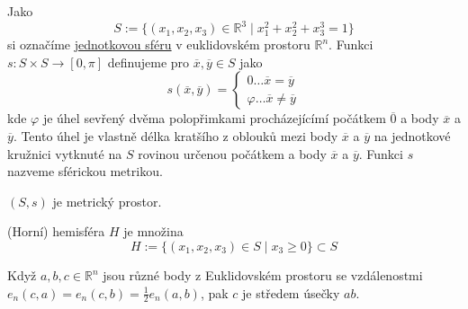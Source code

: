 \documentclass[../main.tex]{subfiles}
\begin{document}
\begin{example}
    Jako \[S := \{ (x_1,x_2,x_3) \in \mathbb{R}^3 \mid x_1^2 + x_2^2 + x_3^3 = 1 \}\] si označíme \underline{jednotkovou sféru} v
    euklidovském prostoru $\mathbb{R}^n$. Funkci $s: S\times S \to [0,\pi]$ definujeme pro $\overline{x}, \overline{y} \in S$
    jako \[ s(\overline{x}, \overline{y}) = \begin{cases}
        0 \dots \overline{x} = \overline{y}\\
        \varphi \dots \overline{x} \neq \overline{y}
    \end{cases} \]
    kde $\varphi$ je úhel sevřený dvěma polopřimkami procházejícímí počátkem $\overline{0}$ a body $\overline{x}$ a $\overline{y}$.
    Tento úhel je vlastně délka kratšího z oblouků mezi body $\overline{x}$ a $\overline{y}$ na jednotkové kružnici vytknuté na $S$ rovinou určenou
    počátkem a body $\overline{x}$ a $\overline{y}$. Funkci $s$ nazveme sférickou metrikou.
\end{example}

\begin{lemma}
    $(S,s)$ je metrický prostor.
\end{lemma}

\begin{definition}
    (Horní) hemisféra $H$ je množina \[ H := \{ (x_1,x_2,x_3) \in S \mid x_3 \geq 0 \} \subset S \]
\end{definition}

\begin{lemma}
    Když $a,b,c \in\mathbb{R}^n$ jsou různé body z Euklidovském prostoru se vzdálenostmi $e_n(c,a) = e_n(c,b) = \frac{1}{2}e_n(a,b)$,
    pak $c$ je středem úsečky $ab$.
\end{lemma}
\end{document}
